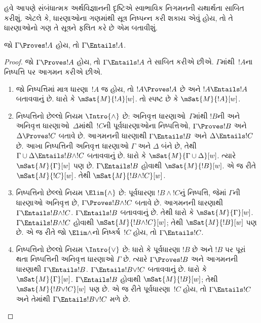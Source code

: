 હવે આપણે સંબંધાત્મક અર્થવિજ્ઞાનની દૃષ્ટિએ સ્વાભાવિક નિગમનની
યથાર્થતા સાબિત કરીશું. એટલે કે, ધારણાઓના ગણમાંથી
સૂત્ર નિષ્પન્ન કરી શકાય એવું હોય, તો તે ધારણાઓનો ગણ તે
સૂત્રને ફલિત કરે છે એમ બતાવીશું.

\begin{thm}[યથાર્થતા]
  જો $\Gamma \Proves !A$ હોય, તો $ \Gamma \Entails !A$.
\end{thm}

\begin{proof}
  જો $\Gamma \Proves !A$ હોય, તો $\Gamma \Entails !A$
  તે સાબિત કરીએ છીએ. $\Gamma$માંથી~$!A$ના
  નિષ્પત્તિ પર આગમન કરીએ છીએ.

  \begin{enumerate}
  \item જો નિષ્પત્તિમાં માત્ર ધારણા~$!A$ જ હોય,
    તો $!A \Proves !A$ છે અને $!A \Entails !A$
    બતાવવાનું છે. ધારો કે $\mSat{M}{!A}[w]$.
    તો સ્પષ્ટ છે કે $\mSat{M}{!A}[w]$.

  \item નિષ્પત્તિનો છેલ્લો નિયમ $\Intro{\land}$ છે:
    અનિવૃત્ત ધારણાઓ~$\Gamma$માંથી
      $!B$ની અને અનિવૃત્ત ધારણાઓ~$\Delta$માંથી~$!C$ની
      પૂર્વધારણાઓના નિષ્પત્તિઓ,
      $\Gamma \Proves !B$ અને $\Delta \Proves !C$ બતાવે છે.
      આગમનની ધારણાથી $\Gamma \Entails !B$ અને
      $\Delta \Entails !C$ છે. આખા નિષ્પત્તિની
      અનિવૃત્ત ધારણાઓ $\Gamma$ અને $\Delta$ બંને
      છે, તેથી $\Gamma \cup \Delta \Entails !B \land !C$
      બતાવવાનું છે.
      ધારો કે $\mSat{M}{\Gamma \cup \Delta}[w]$.
      ત્યારે $\mSat{M}{\Gamma}[w]$ પણ છે.
      $\Gamma \Entails !B$ હોવાથી $\mSat{M}{!B}[w]$.
      એ જ રીતે $\mSat{M}{!C}[w]$. તેથી
      $\mSat{M}{!B \land !C}[w]$.

  \item નિષ્પત્તિનો છેલ્લો નિયમ $\Elim{\land}$ છે:
    પૂર્વધારણા
      $!B \land !C$નું નિષ્પત્તિ, જેમાં $\Gamma$ની
      ધારણાઓ અનિવૃત્ત છે, $\Gamma \Proves !B \land !C$
      બતાવે છે. આગમનની ધારણાથી $\Gamma \Entails !B \land !C$.
      $\Gamma \Entails !B$ બતાવવાનું છે. તેથી ધારો કે
      $\mSat{M}{\Gamma}[w]$. $\Gamma \Entails !B \land !C$
      હોવાથી $\mSat{M}{!B \land !C}[w]$; તેથી
      $\mSat{M}{!B}[w]$ પણ છે. એ જ રીતે જો $\Elim\land$નો
      નિષ્કર્ષ~$!C$ હોય, તો $\Gamma \Entails !C$.

  \item નિષ્પત્તિનો છેલ્લો નિયમ $\Intro{\lor}$ છે:
    ધારો કે પૂર્વધારણા $!B$
      છે અને $!B$ પર પૂરાં થતા નિષ્પત્તિની
      અનિવૃત્ત ધારણાઓ $\Gamma$ છે. ત્યારે
      $\Gamma \Proves !B$ અને આગમનની ધારણાથી
      $\Gamma \Entails !B$. $\Gamma \Entails !B \lor !C$
      બતાવવાનું છે. ધારો કે $\mSat{M}{\Gamma}[w]$.
      $\Gamma \Entails !B$ હોવાથી $\mSat{M}{!B}[w]$;
      તેથી $\mSat{M}{!B \lor !C}[w]$ પણ છે. એ જ રીતે
      પૂર્વધારણા~$!C$ હોય, તો $\Gamma \Entails !C$ અને
      તેમાંથી $\Gamma \Entails !B\lor !C$ મળે છે.


\end{enumerate}
\end{proof}
